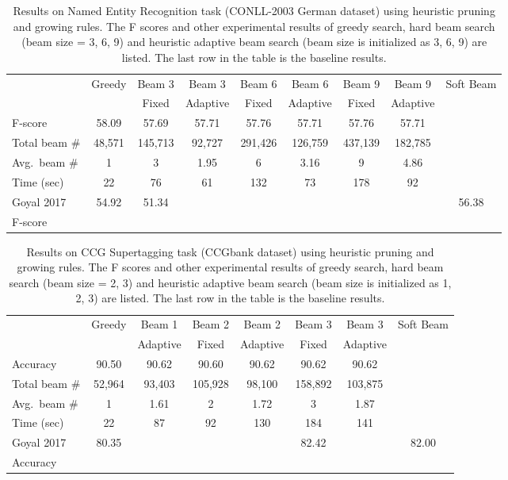 \documentclass[11pt,a4paper]{article}
\begin{document}
\begin{table}[ht]
\centering
\caption{Results on Named Entity Recognition task (CONLL-2003 German dataset) using heuristic pruning and growing rules. The F scores and other experimental results of greedy search, hard beam search (beam size = 3, 6, 9) and heuristic adaptive beam search (beam size is initialized as 3, 6, 9) are listed. The last row in the table is the baseline results.}
\label{tab:NERHeuristic}
\begin{tabular}{lcccccccc}
\toprule
& Greedy & Beam 3 & Beam 3 & Beam 6 & Beam 6 & Beam 9 & Beam 9 & Soft Beam \\
& & Fixed & Adaptive & Fixed & Adaptive & Fixed & Adaptive & \\
\midrule
F-score & 58.09 & 57.69 & 57.71 & 57.76 & 57.71 & 57.76 & 57.71 & \\
Total beam \# & 48,571 & 145,713 & 92,727 & 291,426 & 126,759 & 437,139 & 182,785 & \\
Avg.~beam \# & 1 & 3 & 1.95 & 6 & 3.16 & 9 & 4.86 & \\
Time (sec) & 22 & 76 & 61 & 132 & 73 & 178 & 92 & \\
\midrule
Goyal 2017 & 54.92 & 51.34 & & & & & & 56.38 \\
F-score \\
\bottomrule
\end{tabular}
\end{table}



\begin{table}[ht]
\centering
\caption{Results on CCG Supertagging task (CCGbank dataset) using heuristic pruning and growing rules. The F scores and other experimental results of greedy search, hard beam search (beam size = 2, 3) and heuristic adaptive beam search (beam size is initialized as 1, 2, 3) are listed. The last row in the table is the baseline results.}
\label{tab:CCGHeuristic}
\begin{tabular}{lccccccc}
\toprule
& Greedy & Beam 1 & Beam 2 & Beam 2 & Beam 3 & Beam 3 & Soft Beam \\
&  & Adaptive & Fixed & Adaptive & Fixed & Adaptive & \\
\midrule
Accuracy & 90.50 & 90.62 & 90.60 & 90.62 & 90.62 & 90.62 &  \\
Total beam \# & 52,964 & 93,403 & 105,928 & 98,100 & 158,892 & 103,875 &  \\
Avg.~beam \# & 1 & 1.61 & 2 & 1.72 & 3 & 1.87 &  \\
Time (sec) & 22 & 87 & 92 & 130 & 184 & 141 &  \\
\midrule
Goyal 2017 & 80.35 &  & & & 82.42 & & 82.00 \\
Accuracy \\
\bottomrule
\end{tabular}
\end{table}
\end{document}
